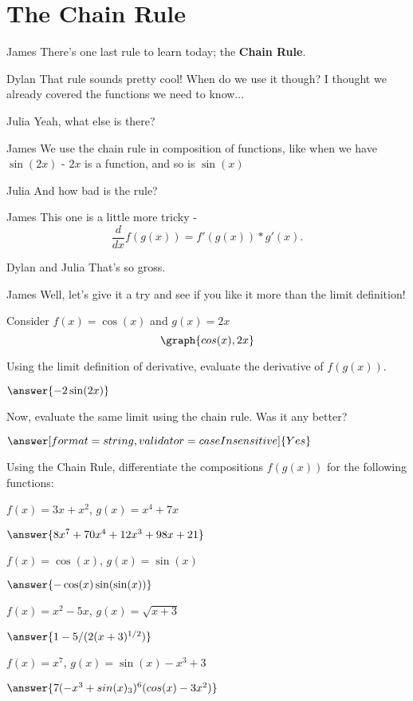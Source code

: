 \documentclass{ximera}
\begin{document}
\section{The Chain Rule}
\begin{dialogue}
\item[James] There's one last rule to learn today; the \textbf{Chain Rule}.
\item[Dylan] That rule sounds pretty cool! When do we use it though? I thought we already covered the functions we need to know...
\item[Julia] Yeah, what else is there?
\item[James] We use the chain rule in composition of functions, like when we have $\sin(2x)$ - $2x$ is a function, and so is $\sin(x)$
\item[Julia] And how bad is the rule?
\item[James] This one is a little more tricky - $$\frac{d}{dx}f(g(x)) = f'(g(x))*g'(x)\text{.}$$
\item[Dylan and Julia] That's so gross.
\item[James] Well, let's give it a try and see if you like it more than the limit definition!
\end{dialogue}
\begin{question}
Consider $f(x) = \cos(x)$ and $g(x) = 2x$
\[
\graph{cos(x), 2x}
\]

Using the limit definition of derivative, evaluate the derivative of $f(g(x))$.

$\answer{-2\sin(2x)}$

Now, evaluate the same limit using the chain rule. Was it any better?

$\answer[format=string,validator=caseInsensitive]{Yes}$
\end{question}
\begin{question}

Using the Chain Rule, differentiate the compositions $f(g(x))$ for the following functions:

$f(x) = 3x+x^2$, $g(x) = x^4+7x$

$\answer{8x^7+70x^4+12x^3+98x+21}$

$f(x) = \cos(x)$, $g(x) = \sin(x)$

$\answer{-\cos(x)\sin(\sin(x))}$

$f(x) = x^2-5x$, $g(x) = \sqrt{x+3}$

$\answer{1-5/(2(x+3)^{1/2})}$

$f(x) = x^7$, $g(x) = \sin(x)-x^3+3$

$\answer{7(-x^3+sin(x)_3)^6(cos(x)-3x^2)}$
\end{question}
\end{document}
